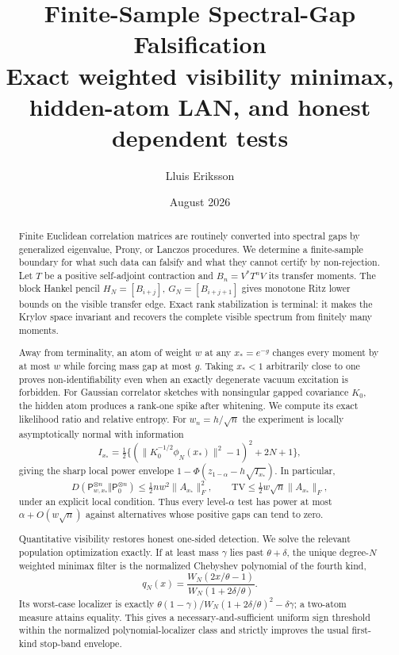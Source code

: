 \documentclass[11pt]{article}
\title{\bfseries Finite-Sample Spectral-Gap Falsification\\[3pt]
\large Exact weighted visibility minimax, hidden-atom LAN, and honest dependent tests}
\author{Lluis Eriksson}
\date{August 2026}
\theoremstyle{definition}
\theoremstyle{remark}
\begin{document}
\maketitle

\begin{abstract}
Finite Euclidean correlation matrices are routinely converted into spectral
gaps by generalized eigenvalue, Prony, or Lanczos procedures.  We determine a
finite-sample boundary for what such data can falsify and what they cannot
certify by non-rejection.  Let $T$ be a positive self-adjoint contraction and
$B_n=V^*T^nV$ its transfer moments.  The block Hankel pencil
$H_N=[B_{i+j}]$, $G_N=[B_{i+j+1}]$ gives monotone Ritz lower bounds on the
visible transfer edge.  Exact rank stabilization is terminal: it makes the
Krylov space invariant and recovers the complete visible spectrum from finitely
many moments.

Away from terminality, an atom of weight $w$ at any $x_*=e^{-g}$ changes every
moment by at most $w$ while forcing mass gap at most $g$.  Taking $x_*<1$
arbitrarily close to one proves non-identifiability even when an exactly
degenerate vacuum excitation is forbidden.  For Gaussian correlator sketches
with nonsingular gapped covariance $K_0$, the hidden atom produces a rank-one
spike after whitening.  We compute its exact likelihood ratio and relative
entropy.  For $w_n=h/\sqrt n$ the experiment is locally asymptotically normal
with information
\[
 I_{x_*}=\tfrac12\{(\|K_0^{-1/2}\phi_N(x_*)\|^2-1)^2+2N+1\},
\]
giving the sharp local power envelope
$1-\Phi(z_{1-\alpha}-h\sqrt{I_{x_*}})$.  In particular,
\[
 D(\mathsf P_{w,x_*}^{\otimes n}\Vert \mathsf P_0^{\otimes n})
 \le \tfrac12 n w^2\|A_{x_*}\|_F^2,
 \qquad
 \mathrm{TV}\le \tfrac12 w\sqrt n\|A_{x_*}\|_F,
\]
under an explicit local condition.  Thus every level-$\alpha$ test has power
at most $\alpha+O(w\sqrt n)$ against alternatives whose positive gaps can tend
to zero.

Quantitative visibility restores honest one-sided detection.  We solve the
relevant population optimization exactly.  If at least mass $\gamma$ lies
past $\theta+\delta$, the unique degree-$N$ weighted minimax filter is the
normalized Chebyshev polynomial of the fourth kind,
\[
 q_N(x)=\frac{W_N(2x/\theta-1)}{W_N(1+2\delta/\theta)}.
\]
Its worst-case localizer is exactly
$\theta(1-\gamma)/W_N(1+2\delta/\theta)^2-\delta\gamma$;
a two-atom measure attains equality.  This gives a necessary-and-sufficient
uniform sign threshold within the normalized polynomial-localizer class and
strictly improves the usual first-kind stop-band envelope.


\end{abstract}
\end{document}
